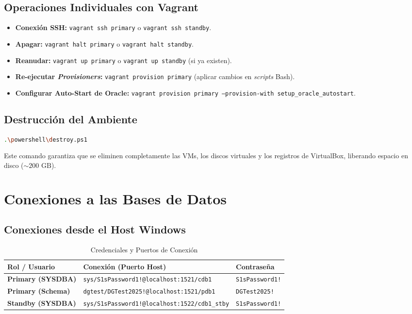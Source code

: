 \documentclass[11pt, a4paper]{report}
\begin{document}
\subsection{Operaciones Individuales con Vagrant}

\begin{itemize}
    \item \textbf{Conexión SSH:} \texttt{vagrant ssh primary} o \texttt{vagrant ssh standby}.
\item \textbf{Apagar:} \texttt{vagrant halt primary} o \texttt{vagrant halt standby}.
    \item \textbf{Reanudar:} \texttt{vagrant up primary} o \texttt{vagrant up standby} (si ya existen).
\item \textbf{Re-ejecutar \textit{Provisioners}:} \texttt{vagrant provision primary} (aplicar cambios en \textit{scripts} Bash).
\item \textbf{Configurar Auto-Start de Oracle:} \texttt{vagrant provision primary --provision-with setup\_oracle\_autostart}.
\end{itemize}

\subsection{Destrucción del Ambiente}

\begin{lstlisting}[language=bash, caption={Destrucción Completa (Recomendado)}]
.\powershell\destroy.ps1
\end{lstlisting}
Este comando garantiza que se eliminen completamente las VMs, los discos virtuales y los registros de VirtualBox, liberando espacio en disco ($\sim 200\text{ GB}$).
\section{Conexiones a las Bases de Datos}

\subsection{Conexiones desde el Host Windows}

\begin{table}[htbp]
    \centering
    \caption{Credenciales y Puertos de Conexión}
    \label{tab:conexiones_host}
    \begin{tabular}{lll}
        \toprule
        \textbf{Rol / Usuario} & \textbf{Conexión (Puerto Host)} & \textbf{Contraseña} \\
        \midrule
        \textbf{Primary (SYSDBA)} & \texttt{sys/S1sPassword1!@localhost:1521/cdb1} & \texttt{S1sPassword1!} \\
        \textbf{Primary (Schema)} & \texttt{dgtest/DGTest2025!@localhost:1521/pdb1} & \texttt{DGTest2025!} \\
        \textbf{Standby (SYSDBA)}
& \texttt{sys/S1sPassword1!@localhost:1522/cdb1\_stby} & \texttt{S1sPassword1!} \\
        \bottomrule
    \end{tabular}
\end{table}
\end{document}
